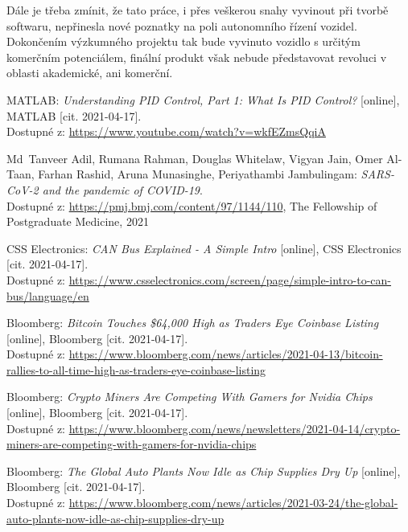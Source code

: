 \documentclass[czech, bachelor]{diploma}
\begin{document}
Dále je třeba zmínit, že tato práce, i přes veškerou snahy vyvinout při tvorbě softwaru, nepřinesla nové poznatky na poli 
autonomního řízení vozidel. Dokončením výzkumného projektu tak bude vyvinuto vozidlo s určitým komerčním potenciálem, finální 
produkt však nebude představovat revoluci v oblasti akademické, ani komerční.

\renewcommand{\bibname}{Zdroje}
\begin{thebibliography}{20}

MATLAB: \textit{Understanding PID Control, Part 1: What Is PID Control?} [online], MATLAB [cit. 2021-04-17]. \\
Dostupné z: \url{https://www.youtube.com/watch?v=wkfEZmsQqiA}

Md~Tanveer Adil, Rumana Rahman, Douglas Whitelaw, Vigyan Jain, Omer Al-Taan, Farhan Rashid, Aruna Munasinghe,
Periyathambi Jambulingam: \textit{SARS-CoV-2 and the pandemic of COVID-19}. \\
Dostupné z: \url{https://pmj.bmj.com/content/97/1144/110}, The Fellowship of Postgraduate Medicine, 2021

CSS Electronics: \textit{CAN Bus Explained - A Simple Intro} [online], CSS Electronics [cit. 2021-04-17]. \\
Dostupné z: \url{https://www.csselectronics.com/screen/page/simple-intro-to-can-bus/language/en}

Bloomberg: \textit{Bitcoin Touches \$64,000 High as Traders Eye Coinbase Listing} [online], Bloomberg [cit. 2021-04-17]. \\
Dostupné z:
\url{https://www.bloomberg.com/news/articles/2021-04-13/bitcoin-rallies-to-all-time-high-as-traders-eye-coinbase-listing}

Bloomberg: \textit{Crypto Miners Are Competing With Gamers for Nvidia Chips} [online], Bloomberg [cit. 2021-04-17]. \\
Dostupné z:
\url{https://www.bloomberg.com/news/newsletters/2021-04-14/crypto-miners-are-competing-with-gamers-for-nvidia-chips}

Bloomberg: \textit{The Global Auto Plants Now Idle as Chip Supplies Dry Up} [online], Bloomberg [cit. 2021-04-17]. \\
Dostupné z:
\url{https://www.bloomberg.com/news/articles/2021-03-24/the-global-auto-plants-now-idle-as-chip-supplies-dry-up}


\end{thebibliography}
\end{document}
